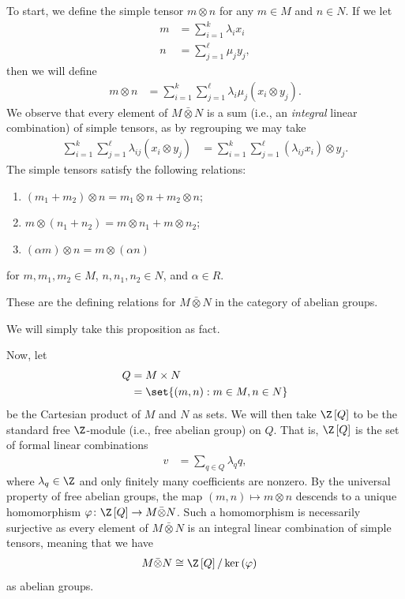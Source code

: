 \documentclass[10pt]{mypackage}
\begin{document}
To start, we define the simple tensor $m\otimes n$ for any $m\in M$ and $n\in N$. If we let
\begin{align*}
  m &= \sum_{i=1}^{k}\lambda_i x_i\\
  n &= \sum_{j=1}^{\ell}\mu_j y_j,
\end{align*}
then we will define
\begin{align*}
  m\otimes n &= \sum_{i=1}^{k}\sum_{j=1}^{\ell} \lambda_i\mu_j \left( x_i\otimes y_j \right).
\end{align*}
We observe that every element of $M\bar\otimes N$ is a sum (i.e., an \textit{integral} linear combination) of simple tensors, as by regrouping we may take
\begin{align*}
  \sum_{i=1}^{k}\sum_{j=1}^{\ell}\lambda_{ij}\left( x_i\otimes y_j \right) &= \sum_{i=1}^{k}\sum_{j=1}^{\ell} \left( \lambda_{ij}x_i \right)\otimes y_j.
\end{align*}
The simple tensors satisfy the following relations:
\begin{enumerate}[(R1)]
  \item $\left( m_1 + m_2 \right)\otimes n = m_1\otimes n + m_2\otimes n$;
  \item $m\otimes \left( n_1 + n_2 \right) = m\otimes n_1 + m\otimes n_2$;
  \item $\left( \alpha m \right)\otimes n = m\otimes \left( \alpha n \right)$
\end{enumerate}
for $m,m_1,m_2\in M$, $n,n_1,n_2\in N$, and $\alpha\in R$.
\begin{proposition}
  These are the defining relations for $M\bar\otimes N$ in the category of abelian groups.
\end{proposition}
We will simply take this proposition as fact.

Now, let
\begin{align*}
  Q &= M\times N\\
    &= \set{\left( m,n \right) : m\in M,n\in N}
\end{align*}
be the Cartesian product of $M$ and $N$ as sets. We will then take $\Z\left[ Q \right]$ to be the standard free $\Z$-module (i.e., free abelian group) on $Q$. That is, $\Z\left[ Q \right]$ is the set of formal linear combinations
\begin{align*}
  v &= \sum_{q\in Q} \lambda_q q,
\end{align*}
where $\lambda_q\in \Z$ and only finitely many coefficients are nonzero. By the universal property of free abelian groups, the map $\left( m,n \right)\mapsto m\otimes n$ descends to a unique homomorphism $\varphi\colon\Z\left[ Q \right]\rightarrow M\bar\otimes N$. Such a homomorphism is necessarily surjective as every element of $M\bar\otimes N$ is an integral linear combination of simple tensors, meaning that we have
\begin{align*}
  M\bar\otimes N &\cong \Z\left[ Q \right]/\ker\left( \varphi \right)
\end{align*}
as abelian groups.
\end{document}
